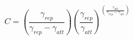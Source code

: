 


$$
 C = \left(\frac{\gamma_{rep}}{\gamma_{rep}-\gamma_{att}}\right) \left(\frac{\gamma_{rep}}{\gamma_{att}}\right)^{\left(\frac{\gamma_{att}}{\gamma_{rep}-\gamma_{att}}\right)}
$$


